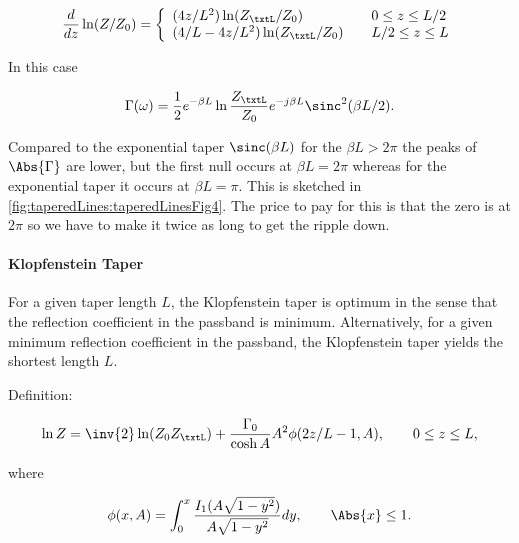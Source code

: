 \begin{equation}\label{eqn:continuumAndOtherTransformersCore:980}
\frac{d}{dz} \ln (Z/Z_0) =
\left\{
\begin{array}{l l}
{(4z/L^2) \ln(Z_\txtL/Z_0)} & \quad \mbox{\( 0 \le z \le L/2\)} \\
{(4/L - 4z/L^2) \ln(Z_\txtL/Z_0)} & \quad \mbox{\( L/2 \le z \le L\)} \\
\end{array}
\right.
\end{equation}

In this case

\begin{equation}\label{eqn:continuumAndOtherTransformersCore:1000}
\Gamma(\omega) = \frac{1}{2} e^{-\beta L} \ln \frac{Z_\txtL}{Z_0} e^{-j \beta L} \sinc^2( \beta L/2 ).
\end{equation}

Compared to the exponential taper \( \sinc( \beta L ) \) for the \( \beta L > 2 \pi \) the peaks of \( \Abs{\Gamma} \) are lower, but the first null occurs at \( \beta L = 2 \pi \) whereas for the exponential taper it occurs at \( \beta L = \pi \).  This is sketched in \cref{fig:taperedLines:taperedLinesFig4}.  The price to pay for this is that the zero is at \( 2 \pi \) so we have to make it twice as long to get the ripple down.


\paragraph{Klopfenstein Taper}

For a given taper length \( L \), the Klopfenstein taper is optimum in the sense that the reflection coefficient in the passband is minimum.  Alternatively, for a given minimum reflection coefficient in the passband, the Klopfenstein taper yields the shortest length \( L \).

Definition:

\begin{equation}\label{eqn:continuumAndOtherTransformersCore:1020}
\ln Z = \inv{2} \ln (Z_0 Z_\txtL) + \frac{\Gamma_0}{\cosh A} A^2 \phi(2 z/L -1, A), \qquad 0 \le z \le L,
\end{equation}

where

\begin{equation}\label{eqn:continuumAndOtherTransformersCore:1040}
\phi(x, A) = \int_0^x \frac{I_1(A\sqrt{1 - y^2})}{A \sqrt{1 - y^2}} dy, \qquad \Abs{x} \le 1.
\end{equation}

